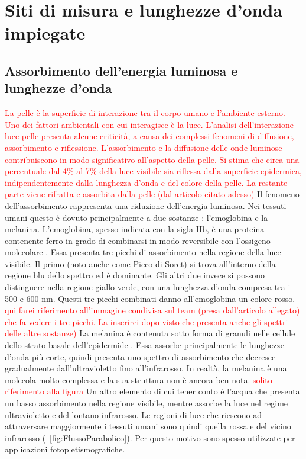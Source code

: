 \section{Siti di misura e lunghezze d'onda impiegate}
\subsection{Assorbimento dell'energia luminosa e lunghezze d'onda}
\textcolor{red}{La pelle è la superficie di interazione tra il corpo umano e l'ambiente esterno. Uno dei fattori ambientali con cui interagisce è la luce. L'analisi dell'interazione luce-pelle presenta alcune criticità, a causa dei complessi fenomeni di diffusione, assorbimento e riflessione. L'assorbimento e la diffusione delle onde luminose contribuiscono in modo significativo all'aspetto della pelle. Si stima che circa una percentuale dal 4\% al 7\% della luce visibile sia riflessa dalla superficie epidermica, indipendentemente dalla lunghezza d'onda e del colore della pelle. La restante parte viene rifratta e assorbita dalla pelle (dal articolo citato adesso)}
Il fenomeno dell'assorbimento rappresenta una riduzione dell'energia luminosa. Nei tessuti umani questo è dovuto principalmente a due sostanze \cite{Lister2012}: l'emoglobina e la melanina. 
L'emoglobina, spesso indicata con la sigla Hb, è una proteina contenente ferro in grado di combinarsi in modo reversibile con l’ossigeno molecolare \cite{SilverthornDeeUnglaub2020Fu:u}. Essa presenta tre picchi di assorbimento nella regione della luce visibile. Il primo (noto anche come Picco di Soret) si trova all'interno della regione blu dello spettro ed è dominante. Gli altri due invece si possono distinguere nella regione giallo-verde, con una lunghezza d'onda compresa tra i 500 e 600 nm. Questi tre picchi combinati danno all'emoglobina un colore rosso. \textcolor{red}{qui farei riferimento all'immagine condivisa sul team (presa dall'articolo allegato) che fa vedere i tre picchi. La inserirei dopo visto che presenta anche gli spettri delle altre sostanze)}
La melanina è contenuta sotto forma di granuli nelle cellule dello strato basale dell’epidermide \cite{SilverthornDeeUnglaub2020Fu:u}. Essa assorbe principalmente le lunghezze d'onda più corte, quindi presenta uno spettro di assorbimento che decresce gradualmente dall'ultravioletto fino all'infrarosso. In realtà, la melanina è una molecola molto complessa e la sua struttura non è ancora ben nota. \textcolor{red}{solito riferimento alla figura}
Un altro elemento di cui tener conto è l'acqua che presenta un basso assorbimento nella regione visibile, mentre assorbe la luce nel regime ultravioletto e del lontano infrarosso. Le regioni di luce che riescono ad attraversare maggiormente i tessuti umani sono quindi quella rossa e del vicino infrarosso (\Fig~\ref{fig:FlussoParabolico}). Per questo motivo sono spesso utilizzate per applicazioni fotopletismografiche.

